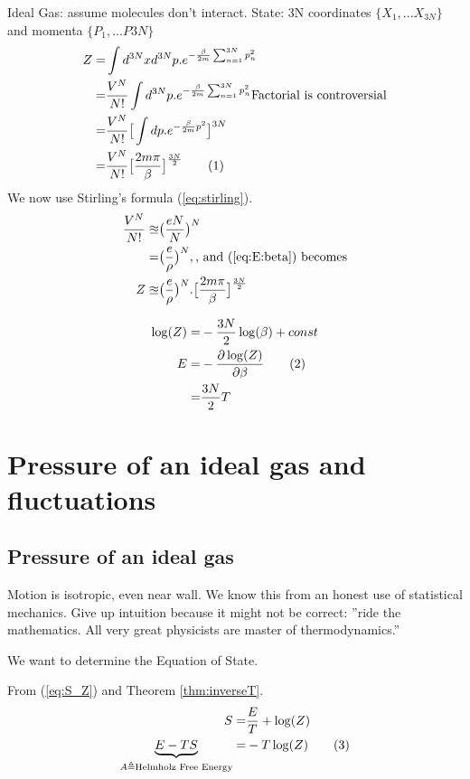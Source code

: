 \documentclass[]{article}
\newcommand\numberthis{\addtocounter{equation}{1}\tag{\theequation}}
\begin{document}
Ideal Gas: assume molecules don't interact.
State: 3N coordinates $\{X_1,...X_{3N}\}$ and momenta $\{P_1,...P3N\}$
\begin{align*}
Z =& \int d^{3N}x d^{3N}p . e^{- \frac{\beta}{2m} \sum_{n=1}^{3N} p_n^2}\\
=& \frac{V^N}{N!} \int d^{3N}p . e^{- \frac{\beta}{2m} \sum_{n=1}^{3N} p_n^2}\text{Factorial is controversial}\\
=& \frac{V^N}{N!} \big[\int dp. e^{-\frac{\beta}{2m}p^2}\big]^{3N}\\
=& \frac{V^N}{N!} \big[\frac{2 m \pi}{\beta}\big]^{\frac{3N}{2}}\numberthis\label{eq:Z_beta}
\end{align*}
We now use Stirling's formula (\ref{eq:stirling}).
\begin{align*}
\frac{V^N}{N!} \approxeq& \big(\frac{eN}{N}\big)^N \\
=& \big(\frac{e}{\rho}\big)^N,\text{, and (\ref{eq:E:beta}) becomes}\\
Z \approxeq& \big(\frac{e}{\rho}\big)^N .  \big[\frac{2 m \pi}{\beta}\big]^{\frac{3N}{2}}
\end{align*}

\begin{align*}
\log(Z) =& - \frac{3N}{2} \log(\beta) + const\\
E =& - \frac{\partial \log(Z)}{\partial \beta}\numberthis \label{eq:E:Z}\\
=& \frac{3N}{2} T
\end{align*}


\section{Pressure of an ideal gas and fluctuations}

\subsection{Pressure of an ideal gas}

Motion is isotropic, even near wall. We know this from an honest use of statistical mechanics. Give up intuition because it might not be correct: ''ride the mathematics. All very great physicists are master of thermodynamics.''

We want to determine the Equation of State.

From (\ref{eq:S_Z}) and Theorem \ref{thm:inverseT}.
\begin{align*}
S =& \frac{E}{T} + \log(Z)\\
\underbrace{E - TS}_{A\triangleq\text{Helmholz Free Energy}} =& -T \log(Z) \numberthis \label{eq:helmholz}
\end{align*}
\end{document}
